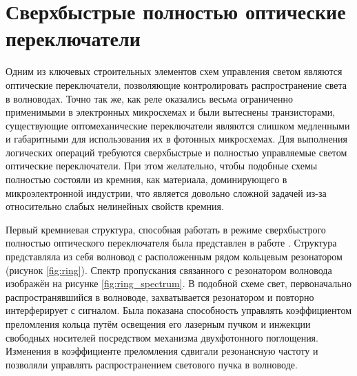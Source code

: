 \section{Сверхбыстрые полностью оптические переключатели}

Одним из ключевых строительных элементов схем управления светом являются оптические переключатели, позволяющие контролировать распространение света в волноводах. Точно так же, как реле оказались весьма ограниченно применимыми в электронных микросхемах и были вытеснены транзисторами, существующие оптомеханические переключатели являются слишком медленными и габаритными для использования их в фотонных микросхемах. Для выполнения логических операций требуются сверхбыстрые и полностью управляемые светом оптические переключатели. При этом желательно, чтобы подобные схемы полностью состояли из кремния, как материала, доминирующего в микроэлектронной индустрии, что является довольно сложной задачей из-за относительно слабых нелинейных свойств кремния.

Первый кремниевая структура, способная работать в режиме сверхбыстрого полностью оптического переключателя была представлен в работе \cite{Vilson2004}. Структура представляла из себя волновод с расположенным рядом кольцевым резонатором (рисунок \ref{fig:ring}). Спектр пропускания связанного с резонатором волновода изображён на рисунке \ref{fig:ring_spectrum}. В подобной схеме свет, первоначально распространявшийся в волноводе, захватывается резонатором и повторно интерферирует с сигналом. Была показана способность управлять коэффициентом преломления кольца путём освещения его лазерным пучком и инжекции свободных носителей посредством механизма двухфотонного поглощения. Изменения в коэффициенте преломления сдвигали резонансную частоту и позволяли управлять распространением светового пучка в волноводе.

